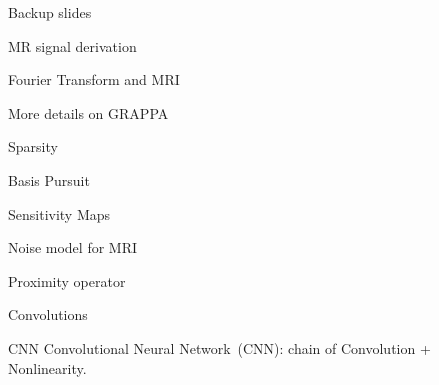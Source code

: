 \appendix

\begin{frame}{}
    Backup slides
\end{frame}

\begin{frame}{MR signal derivation}

\end{frame}

\begin{frame}{Fourier Transform and MRI}

\end{frame}

\begin{frame}{More details on GRAPPA}

\end{frame}

\begin{frame}{Sparsity}

\end{frame}

\begin{frame}{Basis Pursuit}

\end{frame}

\begin{frame}{Sensitivity Maps}

\end{frame}

\begin{frame}{Noise model for MRI}

\end{frame}

\begin{frame}{Proximity operator}

\end{frame}

\begin{frame}{Convolutions}

\end{frame}

\begin{frame}{CNN}
    Convolutional Neural Network~(CNN): chain of Convolution + Nonlinearity.
\end{frame}

